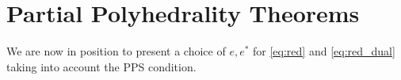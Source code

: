 \documentclass{article}
\newcommand{\reInt}{\mathrm{ri}\,}
\newcommand{\inProd}[2]{\langle #1 , #2 \rangle }
\newcommand{\feasS}{\mathcal{F}_{\text{D }}^s}
\newcommand{\minFaceD}{ {\mathcal{F}_{\min}^D}}
\newcommand{\stdMap}{ {\mathcal{A}}}
\newcommand{\stdCone}{ {\mathcal{K}}}
\newcommand{\stdInt}{ {e}}
\newcommand{\PPS}{{PPS}}
\newcommand{\T}{\ast\hspace{-1pt}}
\newtheorem{lemma}[definition]{Lemma}
\begin{document}

\section{Partial Polyhedrality Theorems}\label{sec:partial}


We are now in position to present a choice of $\stdInt, \stdInt^*$ for \eqref{eq:red} and \eqref{eq:red_dual}
taking into account the {\PPS} condition.
\end{document}

